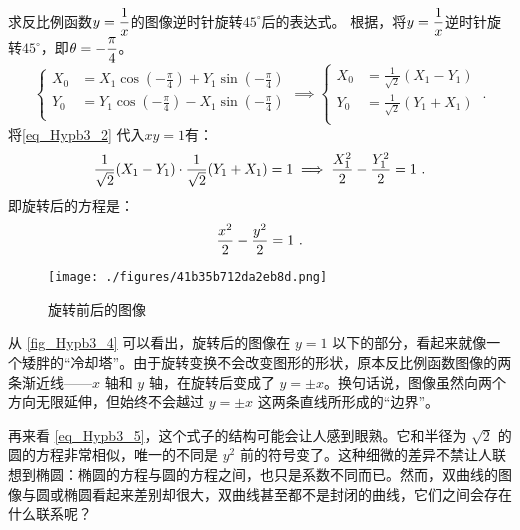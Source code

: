 \begin{example}{求反比例函数$\displaystyle y={1\over x}$的图像逆时针旋转$45^\circ$后的表达式。}\label{ex_Hypb3_1}
根据，将$\displaystyle y={1\over x}$逆时针旋转$45^\circ$，即$\displaystyle\theta=-{\pi\over4}$。
\begin{equation}\label{eq_Hypb3_2}
\begin{cases}
\displaystyle
X_0&=X_1 \cos \left(-{\displaystyle\frac{\pi}{4}}\right) + Y_1 \sin  \left(-{\displaystyle\frac{\pi}{4}}\right)\\
Y_0&=Y_1 \cos  \left(-{\displaystyle\frac{\pi}{4}}\right) - X_1 \sin  \left(-{\displaystyle\frac{\pi}{4}}\right)\\
\end{cases}\implies
\begin{cases}
X_0&={\displaystyle\frac{1}{\sqrt{2}}}(X_1 - Y_1)\\
Y_0&={\displaystyle\frac{1}{\sqrt{2}}}(Y_1+ X_1) \\
\end{cases}~.
\end{equation}
将\autoref{eq_Hypb3_2} 代入$xy=1$有：
\begin{equation}
\displaystyle
{1\over\sqrt{2}}(X_1 - Y_1)\cdot{1\over\sqrt{2}}(Y_1+ X_1)=1\implies {X_1^2\over2}- {Y_1^2\over2}=1~.
\end{equation}
即旋转后的方程是：
\begin{equation}\label{eq_Hypb3_5}
{x^2\over2}- {y^2\over2}=1~.
\end{equation}
\begin{figure}[ht]
\centering
\texttt{[image: ./figures/41b35b712da2eb8d.png]}
\caption{旋转前后的图像} \label{fig_Hypb3_4}
\end{figure}
\end{example}

从 \autoref{fig_Hypb3_4} 可以看出，旋转后的图像在 $y = 1$ 以下的部分，看起来就像一个矮胖的“冷却塔”。由于旋转变换不会改变图形的形状，原本反比例函数图像的两条渐近线——$x$ 轴和 $y$ 轴，在旋转后变成了 $y = \pm x$。换句话说，图像虽然向两个方向无限延伸，但始终不会越过 $y = \pm x$ 这两条直线所形成的“边界”。

再来看 \autoref{eq_Hypb3_5}，这个式子的结构可能会让人感到眼熟。它和半径为 $\sqrt{2}$ 的圆的方程非常相似，唯一的不同是 $y^2$ 前的符号变了。这种细微的差异不禁让人联想到椭圆：椭圆的方程与圆的方程之间，也只是系数不同而已。然而，双曲线的图像与圆或椭圆看起来差别却很大，双曲线甚至都不是封闭的曲线，它们之间会存在什么联系呢？

